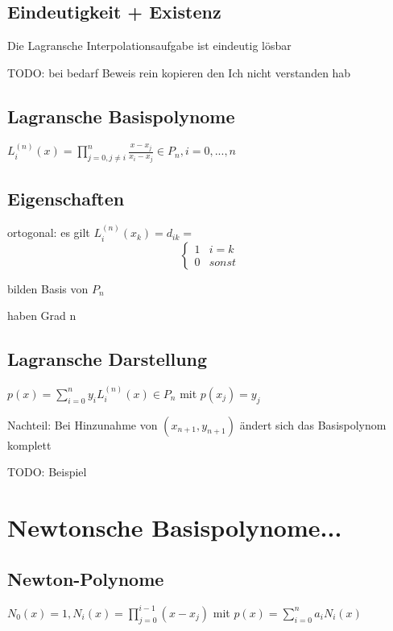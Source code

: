 \documentclass[12pt,a4paper]{article} %
\begin{document}
	\subsection{Eindeutigkeit + Existenz}
	
	Die Lagransche Interpolationsaufgabe ist eindeutig lösbar
	
	TODO: bei bedarf Beweis rein kopieren den Ich nicht verstanden hab
	
	\subsection{Lagransche Basispolynome}
	
	$L_i^{(n)}(x) = \prod\limits_{j = 0, j \ne i}^{n} \frac{x - x_j}{x_i - x_j} \in P_n, i = 0, ..., n$
	
	\subsection{Eigenschaften}
	
	ortogonal: es gilt $L_i^{(n)}(x_k) = d_{ik} =$ 
	\[
		\left\{
			\begin{array}{ll}
				1 & i = k \\
				0 & sonst
			\end{array}
		\right.
	\]
	
	bilden Basis von $P_n$
	
	haben Grad n
	
	\subsection{Lagransche Darstellung}
	
	$p(x) = \sum\limits_{i = 0}^{n}y_iL_i^{(n)}(x) \in P_n$ mit $p(x_j) = y_j$
	
	Nachteil: Bei Hinzunahme von $(x_{n+1}, y_{n+1})$ ändert sich das Basispolynom komplett
	
	
	TODO: Beispiel
	
	\newpage
	
	\section{Newtonsche Basispolynome...}
	
	\subsection{Newton-Polynome}
	
	$N_0(x) = 1, N_i(x) = \prod\limits_{j = 0}^{i - 1}(x - x_j)$ mit $p(x) = \sum\limits_{i = 0}^{n}a_iN_i(x)$
	
\end{document}
